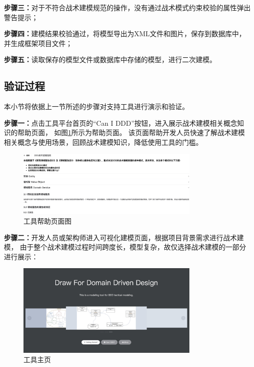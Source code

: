 \textbf{步骤三：}对于不符合战术建模规范的操作，没有通过战术模式约束校验的属性弹出警告提示；

\textbf{步骤四：}建模结果校验通过，将模型导出为XML文件和图片，保存到数据库中，并生成框架项目文件；

\textbf{步骤五：}读取保存的模型文件或数据库中存储的模型，进行二次建模。

\subsection{验证过程}

本小节将依据上一节所述的步骤对支持工具进行演示和验证。

\textbf{步骤一：}点击工具平台首页的“Can I DDD”按钮，进入展示战术建模相关概念知识的帮助页面，
如图\ref{modelknowledge}所示为帮助页面。
该页面帮助开发人员快速了解战术建模相关概念与使用场景，回顾战术建模知识，降低使用工具的门槛。

\begin{figure}[!htbp] %
    \centering %
    \includegraphics[width=0.8\textwidth]{FIGs/chapter5/modelknowledge.png} %
    \caption{工具帮助页面图} %
    \label{modelknowledge} %
\end{figure}%

\textbf{步骤二：}开发人员或架构师进入可视化建模页面，根据项目背景需求进行战术建模，
由于整个战术建模过程时间跨度长，模型复杂，故仅选择战术建模的一部分进行展示：

\begin{figure}[!htbp] %
    \centering %
    \includegraphics[width=0.8\textwidth]{FIGs/chapter5/toolhome.png} %
    \caption{工具主页} %
    \label{toolhome} %
\end{figure}%




